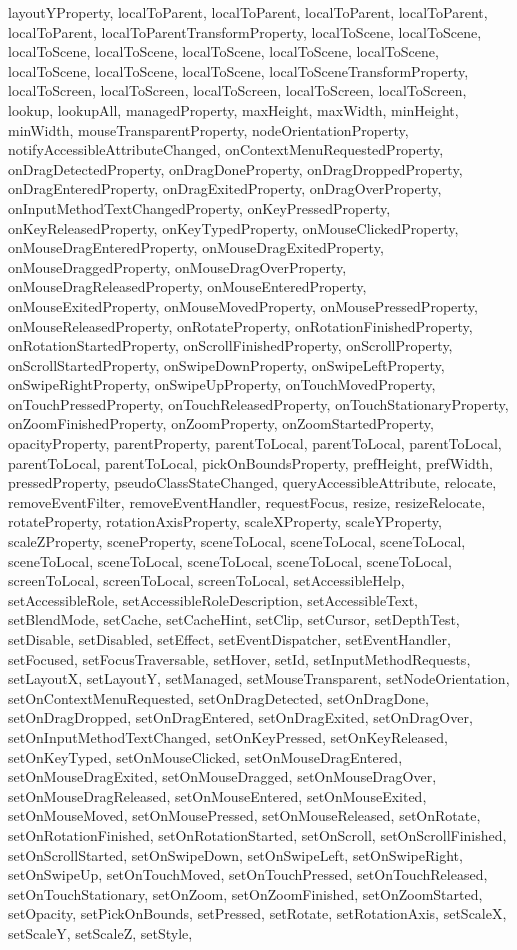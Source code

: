 {{{{{{{{{{{{{{{{{{{{{{{{{{{{{{{{{{{{{{{{{{{{{{{{{{{{{{{{{{{{{{{{{{{{{{{{{{{{layoutYProperty, localToParent, localToParent, localToParent, localToParent, localToParent, localToParentTransformProperty, localToScene, localToScene, localToScene, localToScene, localToScene, localToScene, localToScene, localToScene, localToScene, localToScene, localToSceneTransformProperty, localToScreen, localToScreen, localToScreen, localToScreen, localToScreen, lookup, lookupAll, managedProperty, maxHeight, maxWidth, minHeight, minWidth, mouseTransparentProperty, nodeOrientationProperty, notifyAccessibleAttributeChanged, onContextMenuRequestedProperty, onDragDetectedProperty, onDragDoneProperty, onDragDroppedProperty, onDragEnteredProperty, onDragExitedProperty, onDragOverProperty, onInputMethodTextChangedProperty, onKeyPressedProperty, onKeyReleasedProperty, onKeyTypedProperty, onMouseClickedProperty, onMouseDragEnteredProperty, onMouseDragExitedProperty, onMouseDraggedProperty, onMouseDragOverProperty, onMouseDragReleasedProperty, onMouseEnteredProperty, onMouseExitedProperty, onMouseMovedProperty, onMousePressedProperty, onMouseReleasedProperty, onRotateProperty, onRotationFinishedProperty, onRotationStartedProperty, onScrollFinishedProperty, onScrollProperty, onScrollStartedProperty, onSwipeDownProperty, onSwipeLeftProperty, onSwipeRightProperty, onSwipeUpProperty, onTouchMovedProperty, onTouchPressedProperty, onTouchReleasedProperty, onTouchStationaryProperty, onZoomFinishedProperty, onZoomProperty, onZoomStartedProperty, opacityProperty, parentProperty, parentToLocal, parentToLocal, parentToLocal, parentToLocal, parentToLocal, pickOnBoundsProperty, prefHeight, prefWidth, pressedProperty, pseudoClassStateChanged, queryAccessibleAttribute, relocate, removeEventFilter, removeEventHandler, requestFocus, resize, resizeRelocate, rotateProperty, rotationAxisProperty, scaleXProperty, scaleYProperty, scaleZProperty, sceneProperty, sceneToLocal, sceneToLocal, sceneToLocal, sceneToLocal, sceneToLocal, sceneToLocal, sceneToLocal, sceneToLocal, screenToLocal, screenToLocal, screenToLocal, setAccessibleHelp, setAccessibleRole, setAccessibleRoleDescription, setAccessibleText, setBlendMode, setCache, setCacheHint, setClip, setCursor, setDepthTest, setDisable, setDisabled, setEffect, setEventDispatcher, setEventHandler, setFocused, setFocusTraversable, setHover, setId, setInputMethodRequests, setLayoutX, setLayoutY, setManaged, setMouseTransparent, setNodeOrientation, setOnContextMenuRequested, setOnDragDetected, setOnDragDone, setOnDragDropped, setOnDragEntered, setOnDragExited, setOnDragOver, setOnInputMethodTextChanged, setOnKeyPressed, setOnKeyReleased, setOnKeyTyped, setOnMouseClicked, setOnMouseDragEntered, setOnMouseDragExited, setOnMouseDragged, setOnMouseDragOver, setOnMouseDragReleased, setOnMouseEntered, setOnMouseExited, setOnMouseMoved, setOnMousePressed, setOnMouseReleased, setOnRotate, setOnRotationFinished, setOnRotationStarted, setOnScroll, setOnScrollFinished, setOnScrollStarted, setOnSwipeDown, setOnSwipeLeft, setOnSwipeRight, setOnSwipeUp, setOnTouchMoved, setOnTouchPressed, setOnTouchReleased, setOnTouchStationary, setOnZoom, setOnZoomFinished, setOnZoomStarted, setOpacity, setPickOnBounds, setPressed, setRotate, setRotationAxis, setScaleX, setScaleY, setScaleZ, setStyle, }}}}}}}}}}}}}}}}}}}}}}}}}}}}}}}}}}}}}}}}}}}}}}}}}}}}}}}}}}}}}}}}}}}}}}}}}}}}
